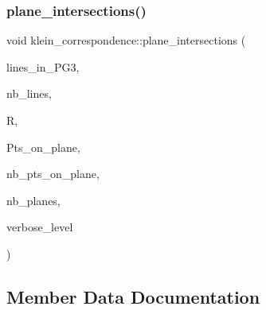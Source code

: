 \mbox{\label{classklein__correspondence_a561aa0d3a66d19a10f9945561a5880b5}} 
\subsubsection{\texorpdfstring{plane\+\_\+intersections()}{plane\_intersections()}}
{\footnotesize\ttfamily void klein\+\_\+correspondence\+::plane\+\_\+intersections (\begin{DoxyParamCaption}\item[{\mbox{\hyperlink{galois_8h_a09fddde158a3a20bd2dcadb609de11dc}{I\+NT}} $\ast$}]{lines\+\_\+in\+\_\+\+P\+G3,  }\item[{\mbox{\hyperlink{galois_8h_a09fddde158a3a20bd2dcadb609de11dc}{I\+NT}}}]{nb\+\_\+lines,  }\item[{\mbox{\hyperlink{classlonginteger__object}{longinteger\+\_\+object}} $\ast$\&}]{R,  }\item[{\mbox{\hyperlink{galois_8h_a09fddde158a3a20bd2dcadb609de11dc}{I\+NT}} $\ast$$\ast$\&}]{Pts\+\_\+on\+\_\+plane,  }\item[{\mbox{\hyperlink{galois_8h_a09fddde158a3a20bd2dcadb609de11dc}{I\+NT}} $\ast$\&}]{nb\+\_\+pts\+\_\+on\+\_\+plane,  }\item[{\mbox{\hyperlink{galois_8h_a09fddde158a3a20bd2dcadb609de11dc}{I\+NT}} \&}]{nb\+\_\+planes,  }\item[{\mbox{\hyperlink{galois_8h_a09fddde158a3a20bd2dcadb609de11dc}{I\+NT}}}]{verbose\+\_\+level }\end{DoxyParamCaption})}



\subsection{Member Data Documentation}
\mbox{\label{classklein__correspondence_a9a9350434d1b4300aad803bc8464dc8b}} 
